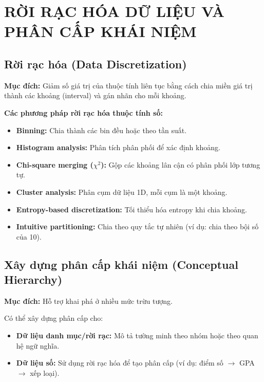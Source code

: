 \documentclass[10pt]{article}
\begin{document}
\section{RỜI RẠC HÓA DỮ LIỆU VÀ PHÂN CẤP KHÁI NIỆM}

\subsection{Rời rạc hóa (Data Discretization)}

\textbf{Mục đích:} Giảm số giá trị của thuộc tính liên tục bằng cách chia miền giá trị thành các khoảng (interval) và gán nhãn cho mỗi khoảng.

\textbf{Các phương pháp rời rạc hóa thuộc tính số:}
\begin{itemize}
    \item \textbf{Binning:} Chia thành các bin đều hoặc theo tần suất.
    \item \textbf{Histogram analysis:} Phân tích phân phối để xác định khoảng.
    \item \textbf{Chi-square merging ($\chi^2$):} Gộp các khoảng lân cận có phân phối lớp tương tự.
    \item \textbf{Cluster analysis:} Phân cụm dữ liệu 1D, mỗi cụm là một khoảng.
    \item \textbf{Entropy-based discretization:} Tối thiểu hóa entropy khi chia khoảng.
    \item \textbf{Intuitive partitioning:} Chia theo quy tắc tự nhiên (ví dụ: chia theo bội số của 10).
\end{itemize}

\subsection{Xây dựng phân cấp khái niệm (Conceptual Hierarchy)}

\textbf{Mục đích:} Hỗ trợ khai phá ở nhiều mức trừu tượng.

Có thể xây dựng phân cấp cho:
\begin{itemize}
    \item \textbf{Dữ liệu danh mục/rời rạc:} Mô tả tường minh theo nhóm hoặc theo quan hệ ngữ nghĩa.
    \item \textbf{Dữ liệu số:} Sử dụng rời rạc hóa để tạo phân cấp (ví dụ: điểm số $\to$ GPA $\to$ xếp loại).
\end{itemize}
\end{document}
